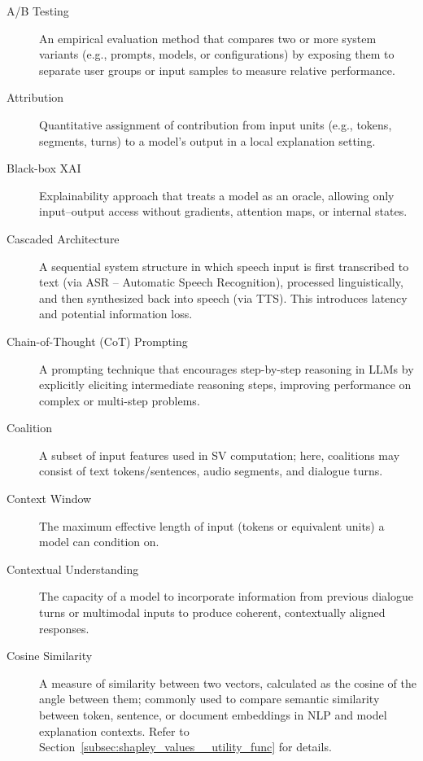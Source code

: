 \begin{description}

    \item[A/B Testing] An empirical evaluation method that compares two or more system variants (e.g., prompts, models, or configurations) by exposing them to separate user groups or input samples to measure relative performance.

    \item[Attribution] Quantitative assignment of contribution from input units (e.g., tokens, segments, turns) to a model’s output in a local explanation setting.

    \item[Black-box XAI] Explainability approach that treats a model as an oracle, allowing only input–output access without gradients, attention maps, or internal states.

    \item[Cascaded Architecture] A sequential system structure in which speech input is first transcribed to text (via ASR -- Automatic Speech Recognition), processed linguistically, and then synthesized back into speech (via TTS). This introduces latency and potential information loss.

    \item[Chain-of-Thought (CoT) Prompting] A prompting technique that encourages step-by-step reasoning in LLMs by explicitly eliciting intermediate reasoning steps, improving performance on complex or multi-step problems.

    \item[Coalition] A subset of input features used in SV computation; here, coalitions may consist of text tokens/sentences, audio segments, and dialogue turns.

    \item[Context Window] The maximum effective length of input (tokens or equivalent units) a model can condition on.

    \item[Contextual Understanding] The capacity of a model to incorporate information from previous dialogue turns or multimodal inputs to produce coherent, contextually aligned responses.

    \item[Cosine Similarity] A measure of similarity between two vectors, calculated as the cosine of the angle between them; commonly used to compare semantic similarity between token, sentence, or document embeddings in NLP and model explanation contexts. Refer to Section~\ref{subsec:shapley_values__utility_func} for details.


\end{description}
